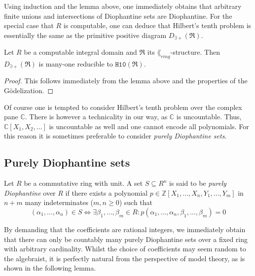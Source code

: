 Using induction and the lemma above, one immediately obtains that arbitrary
finite unions and intersections of Diophantine sets are Diophantine. For the
special case that \(R\) is computable, one can deduce that Hilbert's tenth
problem is essentially the same as the primitive positive diagram
\(D_{∃+}(\mathfrak{R})\).

\begin{cor}
  Let \(R\) be a computable integral domain and \(\mathfrak{R}\) its
  \(\lang_{ring}\)-structure. Then \(D_{∃+}(\mathfrak{R})\) is many-one
  reducible to \(\mathtt{H10}(\mathfrak{R})\).
\end{cor}
\begin{proof}
  This follows immediately from the lemma above and the properties of the
  Gödelization.
\end{proof}

Of course one is tempted to consider Hilbert's tenth problem over the complex
pane \(ℂ\). There is however a technicality in our way, as \(ℂ\) is uncountable.
Thus, \(ℂ[X_1, X_2, …]\) is uncountable as well and one cannot encode all
polynomials. For this reason it is sometimes preferable to consider \emph{purely
Diophantine sets}.

\subsection{Purely Diophantine sets}

\begin{defin}
    Let \(R\) be a commutative ring with unit. A set \(S \subseteq R^n\) is said to
    be \emph{purely Diophantine} over \(R\) if there exists a polynomial \(p ∈
    ℤ[X_1,…,X_n, Y_1,…,Y_m]\) in \(n + m\) many indeterminates (\(m,n ≥ 0\)) such
    that
    \[
      (α_1,…,α_n) ∈ S ⇔
      ∃ β_1,…,β_m ∈ R: p(α_1,…,α_n,β_1,…,β_m) = 0
    \]
\end{defin}

By demanding that the coefficients are rational integers, we immediately obtain
that there can only be countably many purely Diophantine sets over a fixed ring
with arbitrary cardinality. Whilst the choice of coefficients may seem random to
the algebraist, it is perfectly natural from the perspective of model theory, as
is shown in the following lemma.

